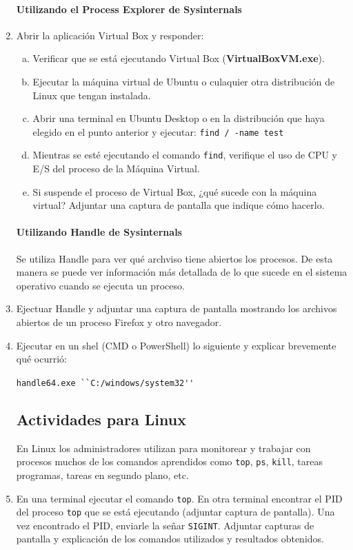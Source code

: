 \documentclass[12pt]{article}
\begin{document}
\begin{enumerate}[1.]
  \paragraph{Utilizando el Process Explorer de Sysinternals}\mbox{}

    \item Abrir la aplicación Virtual Box y responder:
	    \begin{enumerate}[a.]
	      \item Verificar que se está ejecutando Virtual Box (\textbf{VirtualBoxVM.exe}).

	      \item Ejecutar la máquina virtual de Ubuntu o culaquier otra distribución de Linux que tengan instalada.

	      \item Abrir una terminal en Ubuntu Desktop o en la distribución que haya elegido en el punto anterior y ejecutar: \verb|find / -name test|

	      \item Mientras se esté ejecutando el comando \verb|find|, verifique el uso de CPU y E/S del proceso de la Máquina Virtual.

	      \item Si suspende el proceso de Virtual Box, ¿qué sucede con la máquina virtual? Adjuntar una captura de pantalla que indique cómo hacerlo.
	    \end{enumerate}

  \paragraph{Utilizando Handle de Sysinternals}\mbox{}

  Se utiliza Handle para ver qué archviso tiene abiertos los procesos. De esta manera se puede ver información más detallada de lo que sucede en el sistema operativo cuando se ejecuta un proceso.
    \item Ejectuar Handle y adjuntar una captura de pantalla mostrando los archivos abiertos de un proceso Firefox y otro navegador.

    \item Ejecutar en un shel (CMD o PowerShell) lo siguiente y explicar brevemente qué ocurrió: 

    \verb|handle64.exe ``C:/windows/system32''|
  
  \subsection{Actividades para Linux}
  En Linux los administradores utilizan para monitorear y trabajar con procesos muchos de los comandos aprendidos como \verb|top|, \verb|ps|, \verb|kill|, tareas programas, tareas en segundo plano, etc.
    \item En una terminal ejecutar el comando \verb|top|. En otra terminal encontrar el PID del proceso \verb|top| que se está ejecutando (adjuntar captura de pantalla). Una vez encontrado el PID, enviarle la señar \verb|SIGINT|. Adjuntar capturas de pantalla y explicación de los comandos utilizados y resultados obtenidos.


\end{enumerate}
\end{document}
